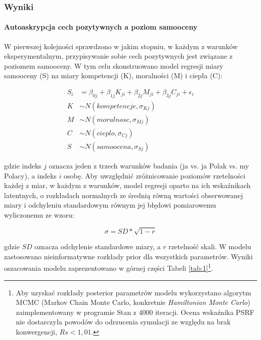 \documentclass[man]{apa6}
\begin{document}
\subsubsection{Wyniki}
\paragraph{Autoaskrypcja cech pozytywnych a poziom samooceny}
W pierwszej kolejności sprawdzono w jakim stopniu, w każdym z warunków eksperymentalnym, przypisywanie sobie cech pozytywnych jest związane z poziomem samooceny. W tym celu skonstruowano model regresji miary samooceny (S) na miary kompetencji (K), moralności (M) i ciepła (C):

\begin{equation}\label{eq:1}
\begin{split}
S_{i} & = \beta_{0j} + \beta_{1j}K_{ji} + \beta_{2j}M_{ji} + \beta_{3j}C_{ji} + \epsilon_{i} \\
K & \sim N(kompetencje, \sigma_{Kj}) \\
M & \sim N(moralnosc, \sigma_{Mj}) \\
C & \sim N(cieplo, \sigma_{Cj}) \\
S & \sim N(samoocena, \sigma_{Sj})
\end{split}
\end{equation}

gdzie indeks $j$ oznacza jeden z trzech warunków badania (ja vs. ja Polak vs. my Polacy), a indeks $i$ osobę. Aby uwzględnić zróżnicowanie poziomów rzetelności każdej z miar, w każdym z warunków, model regresji oparto na ich wskaźnikach latentnych, o rozkładach normalnych ze średnią równą wartości obserwowanej miary i odchyleniu standardowym równym jej błędowi pomiarowemu wyliczonemu ze wzoru:

\begin{equation}\label{eq:err}
\sigma = SD*\sqrt{1 - r}
\end{equation}

gdzie $SD$ oznacza odchylenie standardowe miary, a $r$ rzetelność skali. W modelu zastosowano nieinformatywne rozkłady prior dla wszystkich parametrów. Wyniki oszacowania modelu zaprezentowano w górnej części Tabeli \ref{tab:1}\footnote{Aby uzyskać rozkłady posterior parametrów modelu wykorzystano algorytm MCMC (Markov Chain Monte Carlo, konkretnie \emph{Hamiltonian Monte Carlo}) zaimplementowany w programie Stan \parencite{carpenter2016} z 4000 iteracji. Ocena wskaźnika PSRF nie dostarczyła powodów do odrzucenia symulacji ze względu na brak konwergencji, $Rs < 1,01$.}. \\
\end{document}
